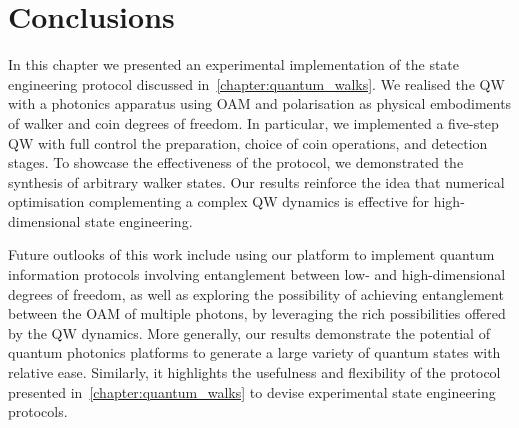 \section{Conclusions}
\label{sec:expQWs:conclusions}

In this chapter we presented an experimental implementation of the state engineering protocol discussed in~\cref{chapter:quantum_walks}. We realised the QW with a photonics apparatus using \ac{OAM} and polarisation as physical embodiments of walker and coin degrees of freedom.
In particular, we implemented a five-step \ac{QW} with full control the preparation, choice of coin operations, and detection stages. To showcase the effectiveness of the protocol, we demonstrated the synthesis of arbitrary walker states.
Our results reinforce the idea that numerical optimisation complementing a complex \ac{QW} dynamics is effective for high-dimensional state engineering.

Future outlooks of this work include using our platform to implement quantum information protocols involving entanglement between low- and high-dimensional degrees of freedom, as well as exploring the possibility of achieving entanglement between the OAM of multiple photons, by leveraging the rich possibilities offered by the QW dynamics.
More generally, our results demonstrate the potential of quantum photonics platforms to generate a large variety of quantum states with relative ease. Similarly, it highlights the usefulness and flexibility of the protocol presented in~\cref{chapter:quantum_walks} to devise experimental state engineering protocols.

